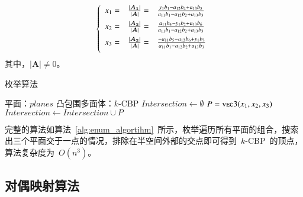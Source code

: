 \begin{equation}
  \label{equa:solution:three-planes}
  \left\{
    \begin{array}{lll}
      x_1 =& \frac{|\bm{A_1}|}{|\bm{A}|} =&\frac{y_1b_1-a_{12}b_4+a_{13}b_5}{a_{11}b_1-a_{12}b_2+a_{13}b_3} 
      \vspace{0.5em}\\ \vspace{0.5em}
      x_2 =& \frac{|\bm{A_2}|}{|\bm{A}|} =&\frac{a_{11}b_4-y_{1}b_2+a_{13}b_6}{a_{11}b_1-a_{12}b_2+a_{13}b_3} 
      \\ \vspace{0.5em}
      x_3 =& \frac{|\bm{A_3}|}{|\bm{A}|} =&\frac{-a_{11}b_5-a_{12}b_6+y_{1}b_3}{a_{11}b_1-a_{12}b_2+a_{13}b_3}
    \end{array}
  \right.
\end{equation}其中，$|\bm{A}| \not= 0$。


\begin{algorithm}[htbp]
\small
\caption{枚举算法}
\label{alg:enum_algortihm}
\begin{algorithmic}[1]
\Require
平面：$planes$
\Ensure
凸包围多面体：$k$-CBP
    \State $Intersection \gets \emptyset $
                      \State $P = \Call{vec3}{x_1, x_2, x_3}$
                        \State {}
                        \State $Intersection \gets Intersection \cup P$
                      \EndIf
                  \EndIf
              \EndIf
          \EndFor
     \EndFor
     \EndIf
  \EndFor
  \State {}
\EndFunction
\end{algorithmic}
\end{algorithm}

完整的算法如算法~\ref{alg:enum_algortihm}~所示，枚举遍历所有平面的组合，搜索出三个平面交于一点的情况，排除在半空间外部的交点即可得到~$k$-CBP~的顶点，算法复杂度为~$O(n^3)$。

\subsection{对偶映射算法}
\label{subsec:intersection-dual-mapping}

